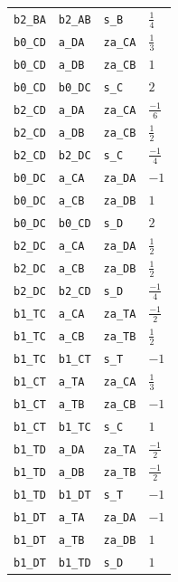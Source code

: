 \begin{longtable}{llll}
\texttt{b2\_BA} & \texttt{b2\_AB} & \texttt{s\_B} & $\frac{1}{4}$\\
\texttt{b0\_CD} & \texttt{a\_DA} & \texttt{za\_CA} & $\frac{1}{3}$\\
\texttt{b0\_CD} & \texttt{a\_DB} & \texttt{za\_CB} & $1$\\
\texttt{b0\_CD} & \texttt{b0\_DC} & \texttt{s\_C} & $2$\\
\texttt{b2\_CD} & \texttt{a\_DA} & \texttt{za\_CA} & $\frac{-1}{6}$\\
\texttt{b2\_CD} & \texttt{a\_DB} & \texttt{za\_CB} & $\frac{1}{2}$\\
\texttt{b2\_CD} & \texttt{b2\_DC} & \texttt{s\_C} & $\frac{-1}{4}$\\
\texttt{b0\_DC} & \texttt{a\_CA} & \texttt{za\_DA} & $-1$\\
\texttt{b0\_DC} & \texttt{a\_CB} & \texttt{za\_DB} & $1$\\
\texttt{b0\_DC} & \texttt{b0\_CD} & \texttt{s\_D} & $2$\\
\texttt{b2\_DC} & \texttt{a\_CA} & \texttt{za\_DA} & $\frac{1}{2}$\\
\texttt{b2\_DC} & \texttt{a\_CB} & \texttt{za\_DB} & $\frac{1}{2}$\\
\texttt{b2\_DC} & \texttt{b2\_CD} & \texttt{s\_D} & $\frac{-1}{4}$\\
\texttt{b1\_TC} & \texttt{a\_CA} & \texttt{za\_TA} & $\frac{-1}{2}$\\
\texttt{b1\_TC} & \texttt{a\_CB} & \texttt{za\_TB} & $\frac{1}{2}$\\
\texttt{b1\_TC} & \texttt{b1\_CT} & \texttt{s\_T} & $-1$\\
\texttt{b1\_CT} & \texttt{a\_TA} & \texttt{za\_CA} & $\frac{1}{3}$\\
\texttt{b1\_CT} & \texttt{a\_TB} & \texttt{za\_CB} & $-1$\\
\texttt{b1\_CT} & \texttt{b1\_TC} & \texttt{s\_C} & $1$\\
\texttt{b1\_TD} & \texttt{a\_DA} & \texttt{za\_TA} & $\frac{-1}{2}$\\
\texttt{b1\_TD} & \texttt{a\_DB} & \texttt{za\_TB} & $\frac{-1}{2}$\\
\texttt{b1\_TD} & \texttt{b1\_DT} & \texttt{s\_T} & $-1$\\
\texttt{b1\_DT} & \texttt{a\_TA} & \texttt{za\_DA} & $-1$\\
\texttt{b1\_DT} & \texttt{a\_TB} & \texttt{za\_DB} & $1$\\
\texttt{b1\_DT} & \texttt{b1\_TD} & \texttt{s\_D} & $1$\\

\end{longtable}
